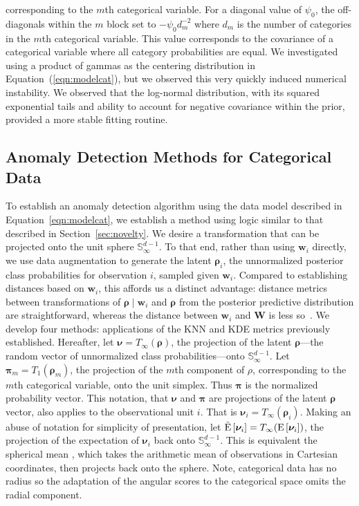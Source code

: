     corresponding to the $m$th categorical variable.  For a diagonal value of 
    $\psi_0$, the off-diagonals within the $m$ block set to $-\psi_0 d_m^{-2}$ 
    where $d_m$ is the number of categories in the $m$th categorical variable.
    This value corresponds to the covariance of a categorical variable where all 
    category probabilities are equal.
    We investigated using a product of gammas as the centering distribution in
    Equation~(\ref{eqn:modelcat}), but we observed this very quickly induced
    numerical instability.  We observed that the log-normal distribution, with
    its squared exponential tails and ability to account for negative covariance
    within the prior, provided a more stable fitting routine.

\subsection{Anomaly Detection Methods for Categorical Data\label{subsec:catscores}}
To establish an anomaly detection algorithm using the data model described in 
    Equation~\ref{eqn:modelcat}, we establish a method using logic similar to 
    that described in Section~\ref{sec:novelty}.  We desire a transformation that 
    can be projected onto the unit sphere $\mathbb{S}_{\infty}^{d-1}$.  To that 
    end, rather than using $\bm{w}_i$ directly, we use data augmentation to 
    generate the latent $\bm{\rho}_i$, the unnormalized posterior class 
    probabilities for observation $i$, sampled given $\bm{w}_i$.  Compared to 
    establishing distances based on $\bm{w}_i$, this affords us a distinct 
    advantage: distance metrics between transformations of 
    $\bm{\rho}\mid\bm{w}_i$ and $\bm{\rho}$ from the posterior predictive 
    distribution are straightforward, whereas the distance between $\bm{w}_i$ 
    and $\bm{W}$ is less so~\citep{Alamuri2014}. We develop four methods: 
    applications of the KNN and KDE metrics previously established.  Hereafter, 
    let $\bm{\nu} = T_{\infty}\left(\bm{\rho}\right)$, the projection of the 
    latent $\bm{\rho}$---the random vector of unnormalized class 
    probabilities---onto $\mathbb{S}_{\infty}^{d-1}$.  Let 
    $\bm{\pi}_{m} = T_{1}(\bm{\rho}_m)$,
    the projection of the $m$th component of $\rho$, corresponding to the $m$th 
    categorical variable, onto the unit simplex. Thus $\bm{\pi}$ is the 
    normalized probability vector.  This notation, that $\bm{\nu}$ and 
    $\bm{\pi}$ are projections of the latent $\bm{\rho}$ vector, also applies 
    to the observational unit $i$.  That is 
    $\bm{\nu}_i = T_{\infty}(\bm{\rho}_i)$. Making an abuse of notation for 
    simplicity of presentation, let 
    $\tilde{\text{E}}\left[\bm{\nu}_i\right] = T_{\infty}(\text{E}\left[\bm{\nu}_i\right])$, 
    the projection of the expectation of $\bm{\nu}_i$ back onto 
    $\mathbb{S}_{\infty}^{d-1}$.  This is equivalent the spherical mean 
    \cite{mardia1999}, which takes the arithmetic mean of observations in 
    Cartesian coordinates, then projects back onto the sphere.  Note, 
    categorical data has no radius so the adaptation of the angular scores to 
    the categorical space omits the radial component.

